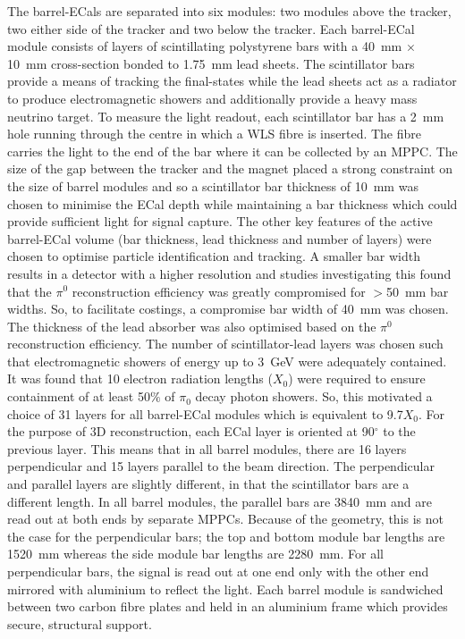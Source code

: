 The barrel-ECals are separated into six modules: two modules above the tracker, two either side of the tracker and two below the tracker.  Each barrel-ECal module consists of layers of scintillating polystyrene bars with a 40~mm $\times$ 10~mm cross-section bonded to 1.75~mm lead sheets.  The scintillator bars provide a means of tracking the final-states while the lead sheets act as a radiator to produce electromagnetic showers and additionally provide a heavy mass neutrino target.  To measure the light readout, each scintillator bar has a 2~mm hole running through the centre in which a WLS fibre is inserted.  The fibre carries the light to the end of the bar where it can be collected by an MPPC.  The size of the gap between the tracker and the magnet placed a strong constraint on the size of barrel modules and so a scintillator bar thickness of 10~mm was chosen to minimise the ECal depth while maintaining a bar thickness which could provide sufficient light for signal capture.  The other key features of the active barrel-ECal volume (bar thickness, lead thickness and number of layers) were chosen to optimise particle identification and tracking.  A smaller bar width results in a detector with a higher resolution and studies investigating this found that the $\pi^0$ reconstruction efficiency was greatly compromised for $>$50~mm bar widths.  So, to facilitate costings, a compromise bar width of 40~mm was chosen.  The thickness of the lead absorber was also optimised based on the $\pi^0$ reconstruction efficiency.  The number of scintillator-lead layers was chosen such that electromagnetic showers of energy up to 3~GeV were adequately contained.  It was found that 10 electron radiation lengths ($X_0$) were required to ensure containment of at least 50$\%$ of $\pi_0$ decay photon showers.  So, this motivated a choice of 31 layers for all barrel-ECal modules which is equivalent to 9.7$X_0$.  For the purpose of 3D reconstruction, each ECal layer is oriented at 90$^\circ$ to the previous layer.  This means that in all barrel modules, there are 16 layers perpendicular and 15 layers parallel to the beam direction.  The perpendicular and parallel layers are slightly different, in that the scintillator bars are a different length.  In all barrel modules, the parallel bars are 3840~mm and are read out at both ends by separate MPPCs.  Because of the geometry, this is not the case for the perpendicular bars; the top and bottom module bar lengths are 1520~mm whereas the side module bar lengths are 2280~mm.  For all perpendicular bars, the signal is read out at one end only with the other end mirrored with aluminium to reflect the light.  Each barrel module is sandwiched between two carbon fibre plates and held in an aluminium frame which provides secure, structural support.
